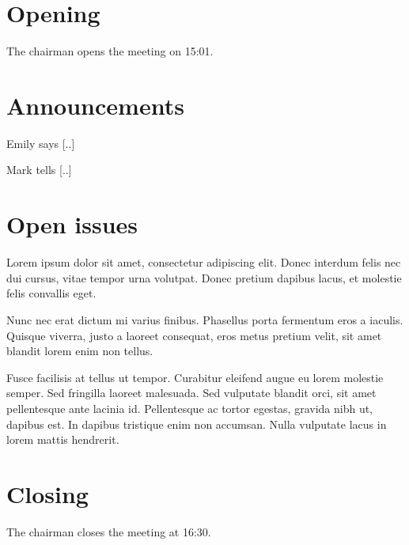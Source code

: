 \documentclass[a4paper]{devops_minutes}
\date{2015-02-17}
\begin{document}
\header

\section{Opening}

The chairman opens the meeting on 15:01.

\section{Announcements}

Emily says [..]

Mark tells [..]

\section{Open issues}

Lorem ipsum dolor sit amet, consectetur adipiscing elit. Donec interdum felis nec dui
cursus, vitae tempor urna volutpat. Donec pretium dapibus lacus, et molestie felis
convallis eget.


Nunc nec erat dictum mi varius finibus. Phasellus porta fermentum eros
a iaculis. Quisque viverra, justo a laoreet consequat, eros metus pretium velit, sit
amet blandit lorem enim non tellus.


Fusce facilisis at tellus ut tempor. Curabitur eleifend augue eu lorem molestie
semper. Sed fringilla laoreet malesuada. Sed vulputate blandit orci, sit amet
pellentesque ante lacinia id. Pellentesque ac tortor egestas, gravida nibh ut,
dapibus est. In dapibus tristique enim non accumsan. Nulla vulputate lacus in lorem
mattis hendrerit.


\section{Closing}

The chairman closes the meeting at 16:30.

\appendix
\actionlist
\end{document}
